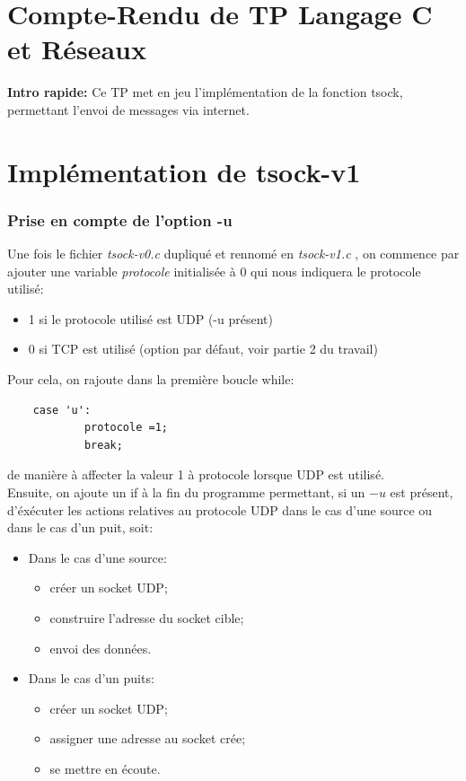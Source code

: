 \documentclass[A4paper,11pt]{report}
\newcommand{\itemb}{\item[$\bullet$ ] }
\begin{document}
\section*{\huge \centering Compte-Rendu de TP Langage C et Réseaux}

\vspace{2cm}
\textbf{Intro rapide:} Ce TP met en jeu l'implémentation de la fonction tsock, permettant l'envoi de messages via internet. 

\section{Implémentation de tsock-v1}

\subsubsection{Prise en compte de l'option -u}

Une fois le fichier \textit{tsock-v0.c} dupliqué et rennomé en \textit{tsock-v1.c} , on commence par ajouter une variable \textit{protocole} initialisée à 0 qui nous indiquera le protocole utilisé:
\begin{itemize}
    \itemb 1 si le protocole utilisé est UDP (-u présent)
    \itemb 0 si TCP est utilisé (option par défaut, voir partie 2 du travail)
\end{itemize}

Pour cela, on rajoute dans la première boucle while:

\begin{lstlisting}
    case 'u':
			protocole =1;		
			break;     

\end{lstlisting}

de manière à affecter la valeur 1 à protocole lorsque UDP est utilisé.\\


Ensuite, on ajoute un if à la fin du programme permettant, si un $-u$ est présent, d'éxécuter les actions relatives au protocole UDP dans le cas d'une source ou dans le cas d'un puit, soit:
\begin{itemize}
    \itemb Dans le cas d'une source:
    \begin{itemize}
        \item créer un socket UDP;
        \item construire l'adresse du socket cible;
        \item envoi des données.
    \end{itemize}
    \itemb Dans le cas d'un puits:
    \begin{itemize}
        \item créer un socket UDP;
        \item assigner une adresse au socket crée;
        \item se mettre en écoute.
    \end{itemize}
\end{itemize} 
\end{document}

